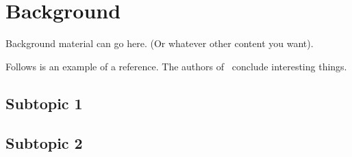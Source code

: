 \section{Background}
\label{s:background} %

Background material can go here.
(Or whatever other content you want).

Follows is an example of a reference.
The authors of~\cite{Humar2011} conclude interesting things.

\subsection{Subtopic 1}
\lipsum[4]

\subsection{Subtopic 2}
\lipsum[5]
